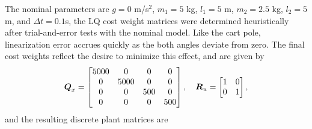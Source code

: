 The nominal parameters are $g = 0$ m/s$^{2}$, $m_{1} = 5$ kg, $l_{1} = 5$ m, $m_{2} = 2.5$ kg, $l_{2} = 5$ m, and $\Delta t = 0.1$s, the LQ cost weight matrices were determined heuristically after trial-and-error tests with the nominal model.  Like the cart pole, linearization error accrues quickly as the both angles deviate from zero.  The final cost weights reflect the desire to minimize this effect, and are given by
\begin{equation*}
\begin{aligned}
    \vb*{Q}_{x} = \begin{bmatrix}
        5000 & 0 & 0 & 0\\
        0 & 5000 & 0 & 0\\
        0 & 0 & 500 & 0\\
        0 & 0 & 0 & 500\\
    \end{bmatrix}, \hspace{10pt}
    \vb*{R}_{u} = \begin{bmatrix}
        1 & 0\\
        0 & 1\\
    \end{bmatrix},
\end{aligned}
\end{equation*}
and the resulting discrete plant matrices are
